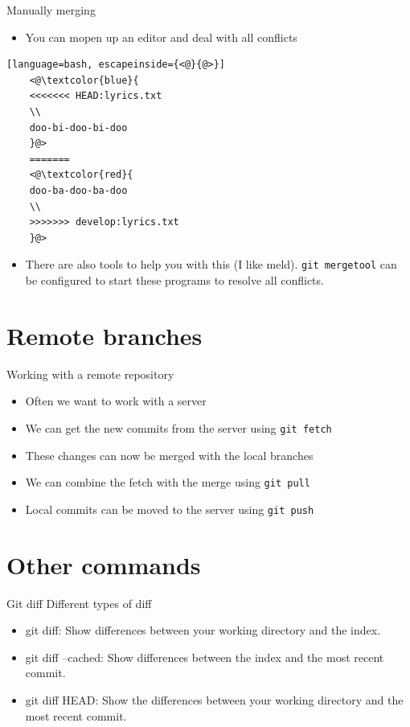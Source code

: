 \documentclass[12pt]{beamer}
\begin{document}
\begin{frame}[fragile]{Manually merging}
		\begin{itemize}
			\item You can mopen up an editor and deal with all conflicts
		\end{itemize}
	\begin{lstlisting}[language=bash, escapeinside={<@}{@>}]
	<@\textcolor{blue}{ 
	<<<<<<< HEAD:lyrics.txt
	\\
	doo-bi-doo-bi-doo
	}@> 
	=======
	<@\textcolor{red}{ 
	doo-ba-doo-ba-doo 
	\\
	>>>>>>> develop:lyrics.txt 
	}@>
	\end{lstlisting}
		\begin{itemize}
		\item There are also tools to help you with this (I like meld). \texttt{git mergetool} can be configured to start these programs to resolve all conflicts.
		\end{itemize}
\end{frame}

\section{Remote branches}

\begin{frame}[fragile]{Working with a remote repository}
\begin{itemize}
\item Often we want to work with a server
\item We can get the new commits from the server using \texttt{git fetch}
\item These changes can now be merged with the local branches
\item We can combine the fetch with the merge using \texttt{git pull}
\item Local commits can be moved to the server using \texttt{git push}
\end{itemize}
\end{frame}


\section{Other commands}

\begin{frame}{Git diff}
	Different types of diff
	\begin{itemize}
    \item git diff: Show differences between your working directory and the index.
    \item git diff –cached: Show differences between the index and the most recent commit.
    \item git diff HEAD: Show the differences between your working directory and the most recent commit.
	\end{itemize}	
\end{frame}	
\end{document}
